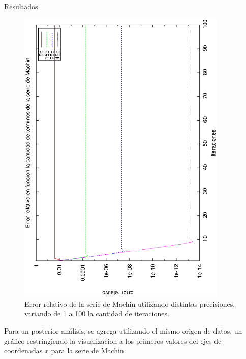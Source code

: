\begin{section}{Resultados}
	\begin{figure}[H]
	  \centering
		\includegraphics[width=10cm,angle=-90]{graficos/machin_1a100it.eps}
	  \caption{Error relativo de la serie de Machin utilizando distintas precisiones, variando de 1 a 100 la cantidad de iteraciones.}
	  \label{fig:machin_100it}
	\end{figure}
	
	Para un posterior análisis, se agrega utilizando el mismo origen de datos, un gráfico restringiendo la visualizacion a los primeros valores del ejes de coordenadas $x$ para la serie de Machin.
	

\end{section}
